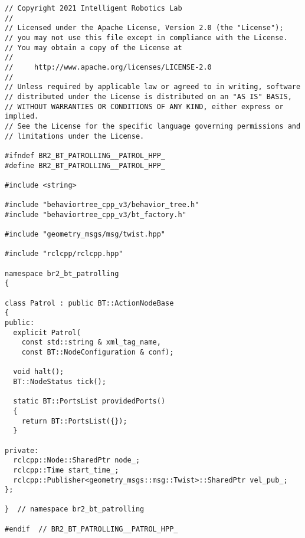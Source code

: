  \footnotesize
\begin{tcolorbox}[sharp corners, colframe=gray!80, colback=LightGray, left=0pt, top=0pt, bottom=0pt, title=\texttt{br2\_bt\_patrolling/include/br2\_bt\_patrolling/Patrol.hpp}]
  \begin{verbatim}
// Copyright 2021 Intelligent Robotics Lab
//
// Licensed under the Apache License, Version 2.0 (the "License");
// you may not use this file except in compliance with the License.
// You may obtain a copy of the License at
//
//     http://www.apache.org/licenses/LICENSE-2.0
//
// Unless required by applicable law or agreed to in writing, software
// distributed under the License is distributed on an "AS IS" BASIS,
// WITHOUT WARRANTIES OR CONDITIONS OF ANY KIND, either express or implied.
// See the License for the specific language governing permissions and
// limitations under the License.

#ifndef BR2_BT_PATROLLING__PATROL_HPP_
#define BR2_BT_PATROLLING__PATROL_HPP_

#include <string>

#include "behaviortree_cpp_v3/behavior_tree.h"
#include "behaviortree_cpp_v3/bt_factory.h"

#include "geometry_msgs/msg/twist.hpp"

#include "rclcpp/rclcpp.hpp"

namespace br2_bt_patrolling
{

class Patrol : public BT::ActionNodeBase
{
public:
  explicit Patrol(
    const std::string & xml_tag_name,
    const BT::NodeConfiguration & conf);

  void halt();
  BT::NodeStatus tick();

  static BT::PortsList providedPorts()
  {
    return BT::PortsList({});
  }

private:
  rclcpp::Node::SharedPtr node_;
  rclcpp::Time start_time_;
  rclcpp::Publisher<geometry_msgs::msg::Twist>::SharedPtr vel_pub_;
};

}  // namespace br2_bt_patrolling

#endif  // BR2_BT_PATROLLING__PATROL_HPP_
    \end{verbatim}
    \end{tcolorbox}
  \normalsize

